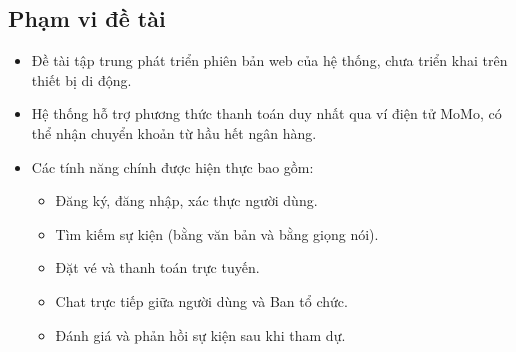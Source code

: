 \subsection{Phạm vi đề tài}
\begin{itemize}
    \item[-] Đề tài tập trung phát triển phiên bản web của hệ thống, chưa triển khai trên thiết bị di động.
    \item[-] Hệ thống hỗ trợ phương thức thanh toán duy nhất qua ví điện tử MoMo, có thể nhận chuyển khoản từ hầu hết ngân hàng.
    \item[-] Các tính năng chính được hiện thực bao gồm:
    \begin{itemize}
        \item[1.] Đăng ký, đăng nhập, xác thực người dùng.
        \item[2.] Tìm kiếm sự kiện (bằng văn bản và bằng giọng nói).
        \item[3.] Đặt vé và thanh toán trực tuyến.
        \item[4.] Chat trực tiếp giữa người dùng và Ban tổ chức.
        \item[5.] Đánh giá và phản hồi sự kiện sau khi tham dự.
    \end{itemize}
\end{itemize}
